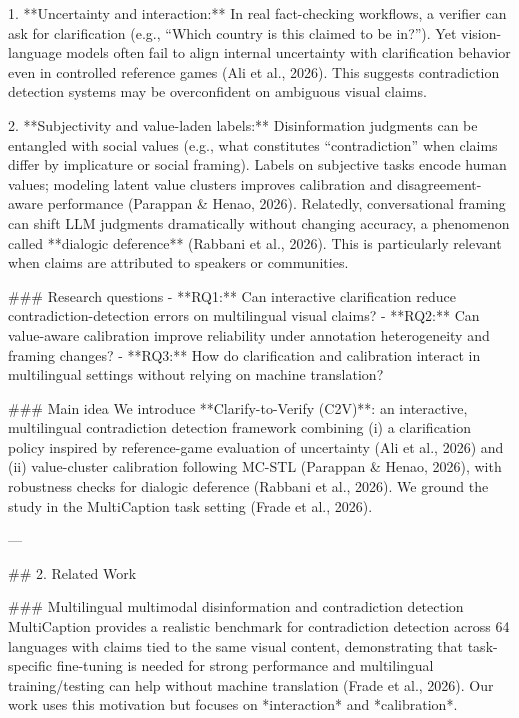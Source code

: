 1. **Uncertainty and interaction:** In real fact-checking workflows, a verifier can ask for clarification (e.g., “Which country is this claimed to be in?”). Yet vision-language models often fail to align internal uncertainty with clarification behavior even in controlled reference games (Ali et al., 2026). This suggests contradiction detection systems may be overconfident on ambiguous visual claims.

2. **Subjectivity and value-laden labels:** Disinformation judgments can be entangled with social values (e.g., what constitutes “contradiction” when claims differ by implicature or social framing). Labels on subjective tasks encode human values; modeling latent value clusters improves calibration and disagreement-aware performance (Parappan & Henao, 2026). Relatedly, conversational framing can shift LLM judgments dramatically without changing accuracy, a phenomenon called **dialogic deference** (Rabbani et al., 2026). This is particularly relevant when claims are attributed to speakers or communities.

### Research questions  
- **RQ1:** Can interactive clarification reduce contradiction-detection errors on multilingual visual claims?  
- **RQ2:** Can value-aware calibration improve reliability under annotation heterogeneity and framing changes?  
- **RQ3:** How do clarification and calibration interact in multilingual settings without relying on machine translation?

### Main idea  
We introduce **Clarify-to-Verify (C2V)**: an interactive, multilingual contradiction detection framework combining (i) a clarification policy inspired by reference-game evaluation of uncertainty (Ali et al., 2026) and (ii) value-cluster calibration following MC-STL (Parappan & Henao, 2026), with robustness checks for dialogic deference (Rabbani et al., 2026). We ground the study in the MultiCaption task setting (Frade et al., 2026).

---

## 2. Related Work  

### Multilingual multimodal disinformation and contradiction detection  
MultiCaption provides a realistic benchmark for contradiction detection across 64 languages with claims tied to the same visual content, demonstrating that task-specific fine-tuning is needed for strong performance and multilingual training/testing can help without machine translation (Frade et al., 2026). Our work uses this motivation but focuses on *interaction* and *calibration*.


